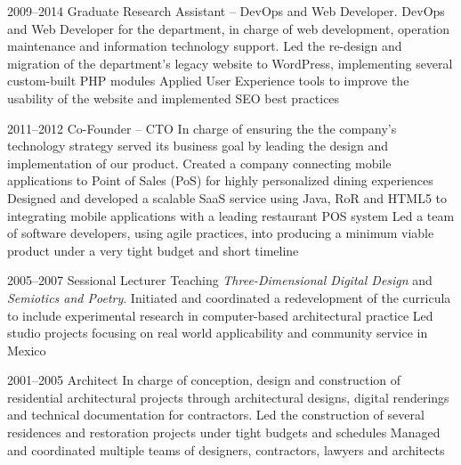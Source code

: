 \documentclass[full]{rvca}
\begin{document}
{2009--2014}
{Graduate Research Assistant -- DevOps and Web Developer.} %
{DevOps and Web Developer for the department, in charge of web development, operation maintenance and information technology support.}
{Led the re-design and migration of the department's legacy website to WordPress, implementing several custom-built PHP modules}
{Applied User Experience tools to improve the usability of the website and implemented SEO best practices}
{}
{}

{2011--2012}
{Co-Founder -- CTO} %
{In charge of ensuring the the company's technology strategy served its business goal by leading the design and implementation of our product.} %
{Created a company connecting mobile applications to Point of Sales (PoS) for highly personalized dining experiences}
{Designed and developed a scalable SaaS service using Java, RoR and HTML5 to integrating mobile applications with a leading restaurant POS system}
{Led a team of software developers, using agile practices, into producing a minimum viable product under a very tight budget and short timeline}
{}
{}

{2005--2007}
{Sessional Lecturer} %
{Teaching \emph{Three-Dimensional Digital Design} and \emph{Semiotics and Poetry}.} %
{Initiated and coordinated a redevelopment of the curricula to include experimental research in computer-based architectural practice}
{Led studio projects focusing on real world applicability and community service in Mexico}
{}
{}
{}

{2001--2005}
{Architect} %
{In charge of conception, design and construction of residential architectural projects through architectural designs, digital renderings and technical documentation for contractors.} %
{Led the construction of several residences and restoration projects under tight budgets and schedules}
{Managed and coordinated multiple teams of designers, contractors, lawyers and architects}
{}
{}
{}
\end{document}
